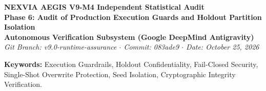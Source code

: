 \documentclass[10pt,a4paper]{article}
\begin{document}
\begin{center}
    {\LARGE \textbf{NEXVIA AEGIS V9-M4 Independent Statistical Audit}}\\[6pt]
    {\Large \textbf{Phase 6: Audit of Production Execution Guards and Holdout Partition Isolation}}\\[10pt]
    \textbf{Autonomous Verification Subsystem (Google DeepMind Antigravity)}\\
    \textit{Git Branch: v9.0-runtime-assurance \quad $\cdot$ \quad Commit: 083ade9 \quad $\cdot$ \quad Date: October 25, 2026}\\[12pt]
\end{center}

\begin{abstract}
\noindent This audit report conducts an empirical and architectural verification of the execution security boundaries, partition isolation mechanisms, and single-shot overwrite guards implemented in the NEXVIA AEGIS V9-M4 confirmatory evaluation harness (\texttt{experiments/v9\_evaluate\_holdout.py}). We audit the default CLI behavior, the read-only preflight status inspector, the fail-closed execution authorization token barrier, seed-block boundary enforcement, directory isolation rules, and cryptographic payload verification. Crucially, we perform an automated filesystem audit confirming that no production holdout manifests (\texttt{test\_mix\_manifest\_r1.json}, \texttt{test\_scen\_manifest\_r1.json}) or production holdout results (\texttt{results/v9/test\_mix/}, \texttt{results/v9/test\_scen/}) exist, establishing that the reserved confirmatory holdout partitions remain completely untouched.
\end{abstract}

\vspace{6pt}
\noindent \textbf{Keywords:} Execution Guardrails, Holdout Confidentiality, Fail-Closed Security, Single-Shot Overwrite Protection, Seed Isolation, Cryptographic Integrity Verification.
\end{document}

